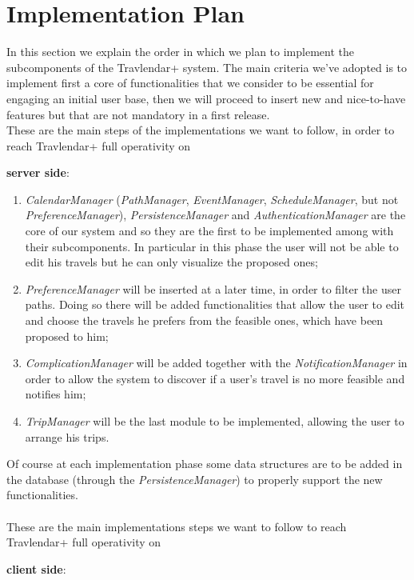 \section{Implementation Plan}
In this section we explain the order in which we plan to implement the subcomponents of the Travlendar+ system.
The main criteria we've adopted is to implement first a core of functionalities that we consider to be essential for engaging an initial user base, then we will proceed to insert new and nice-to-have features but that are not mandatory in a first release.\\
These are the main steps of the implementations we want to follow, in order to reach Travlendar+ full operativity on\begin{large}
\textbf{server side}:
\end{large}
\begin{enumerate}
\item \textit{CalendarManager} (\textit{PathManager}, \textit{EventManager}, \textit{ScheduleManager}, but not \textit{PreferenceManager}), \textit{PersistenceManager} and \textit{AuthenticationManager} are the core of our system and so they are the first to be implemented among with their subcomponents. In particular in this phase the user will not be able to edit his travels but he can only visualize the proposed ones;
\item \textit{PreferenceManager} will be inserted at a later time, in order to filter the user paths. Doing so there will be added functionalities that allow the user to edit and choose the travels he prefers from the feasible ones, which have been proposed to him;
\item \textit{ComplicationManager} will be added together with the \textit{NotificationManager} in order to allow the system to discover if a user's travel is no more feasible and notifies him;
\item \textit{TripManager} will be the last module to be implemented, allowing the user to arrange his trips.
\end{enumerate}
Of course at each implementation phase some data structures are to be added in the database (through the \textit{PersistenceManager}) to properly support the new functionalities.\\ \\
\noindent
These are the main implementations steps we want to follow to reach Travlendar+ full operativity on\begin{large}
\textbf{client side}:
\end{large}
